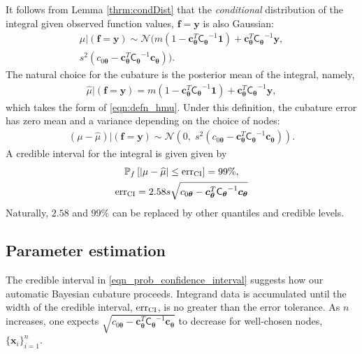 \documentclass[twocolumn]{svjour3}          %
\newcommand{\bm}[1]{\boldsymbol{#1}}
\newcommand{\vtheta}{{\bm{\theta}}}
\newcommand{\vc}{\bm{c}}
\newcommand{\vf}{\bm{f}}
\newcommand{\vx}{\bm{x}}
\newcommand{\vy}{\bm{y}}
\newcommand{\vone}{\bm{1}}
\newcommand{\mCtheta}{{\mathsf{C}_{\vtheta}}}
\newcommand{\calN}{\mathcal{N}}
\newcommand{\hmu}{\widehat{\mu}}
\newcommand{\err}{\textup{err}}
\begin{document}
It follows from Lemma \ref{thrm:condDist} that the \emph{conditional} distribution of the integral given observed function values, $\vf = \vy$ is also Gaussian:
\begin{multline} \label{eqn:condInteg}
\mu | (\vf = \vy) \sim \calN \bigl(m (1 - \vc_\vtheta^T \mCtheta^{-1} \vone)  + \vc_\vtheta^T \mCtheta^{-1} \vy, 
\\
s^2(c_{0\vtheta}  -\vc_\vtheta ^T \mCtheta^{-1} \vc_\vtheta) \bigr).
\end{multline}
The natural choice for  the cubature is the posterior mean of the integral, namely, 
\begin{align}
\label{eqn:BayesCub}
\widehat{\mu}  \vert ( \vf = \vy)
= m(1 - \vc_\vtheta^T  \mCtheta^{-1} \vone)
+ \vc_\vtheta^T \mCtheta^{-1} \vy,
\end{align}
which takes the form of \eqref{eqn:defn_hmu}.
Under this definition, the cubature error has zero mean and a variance depending on the choice of nodes:
\begin{align*}
(\mu-\hmu) | (\vf = \vy)
 \sim  \calN 
\left(
0, \;
s^2 (c_{0\vtheta} - \vc_\vtheta^T\mCtheta^{-1}\vc_\vtheta) 
\right).
\end{align*}
A credible interval for the integral is given given by 
\begin{subequations} \label{eqn_prob_confidence_interval}
\begin{gather}
\mathbb{P}_f \left[
|\mu-\hmu| \leq \err_{\textup{CI}}
\right] = 99\%, \\
\err_{\textup{CI}} = 2.58 s \sqrt{c_{0\vtheta} - \vc_\vtheta^T\mCtheta^{-1}\vc_\vtheta}
\end{gather}
\end{subequations}
Naturally, $2.58$ and $99\%$ can be replaced by other quantiles and credible levels.

\subsection{Parameter estimation}
The credible interval in \eqref{eqn_prob_confidence_interval} suggests how our automatic Bayesian cubature proceeds.  Integrand data is accumulated until the width of the credible interval, $\err_{\textup{CI}}$, is no greater than the error tolerance.  As $n$ increases, one expects $\sqrt{c_{0\vtheta} - \vc_\vtheta^T\mCtheta^{-1}\vc_\vtheta}$ to decrease for well-chosen nodes, $\{\vx_i\}_{i=1}^n$.
\end{document}
